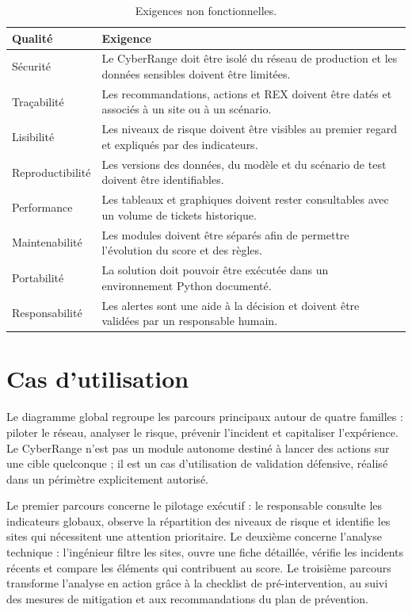 \documentclass[12pt,a4paper,oneside]{report}
\begin{document}
\begin{table}[H]
\centering
\small
\caption{Exigences non fonctionnelles.}
\begin{tabularx}{\textwidth}{B{4.0cm} X}
\toprule
Qualité & Exigence\\
\midrule
Sécurité & Le CyberRange doit être isolé du réseau de production et les données sensibles doivent être limitées.\\
Traçabilité & Les recommandations, actions et REX doivent être datés et associés à un site ou à un scénario.\\
Lisibilité & Les niveaux de risque doivent être visibles au premier regard et expliqués par des indicateurs.\\
Reproductibilité & Les versions des données, du modèle et du scénario de test doivent être identifiables.\\
Performance & Les tableaux et graphiques doivent rester consultables avec un volume de tickets historique.\\
Maintenabilité & Les modules doivent être séparés afin de permettre l’évolution du score et des règles.\\
Portabilité & La solution doit pouvoir être exécutée dans un environnement Python documenté.\\
Responsabilité & Les alertes sont une aide à la décision et doivent être validées par un responsable humain.\\
\bottomrule
\end{tabularx}
\end{table}

\section{Cas d’utilisation}

Le diagramme global regroupe les parcours principaux autour de quatre familles : piloter le réseau, analyser le risque, prévenir l’incident et capitaliser l’expérience. Le CyberRange n’est pas un module autonome destiné à lancer des actions sur une cible quelconque ; il est un cas d’utilisation de validation défensive, réalisé dans un périmètre explicitement autorisé.

Le premier parcours concerne le pilotage exécutif : le responsable consulte les indicateurs globaux, observe la répartition des niveaux de risque et identifie les sites qui nécessitent une attention prioritaire. Le deuxième concerne l’analyse technique : l’ingénieur filtre les sites, ouvre une fiche détaillée, vérifie les incidents récents et compare les éléments qui contribuent au score. Le troisième parcours transforme l’analyse en action grâce à la checklist de pré-intervention, au suivi des mesures de mitigation et aux recommandations du plan de prévention.
\end{document}
